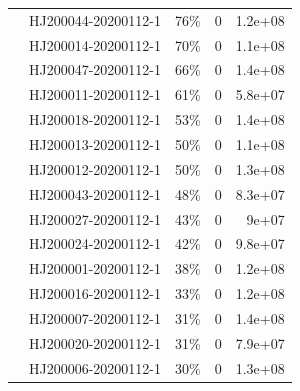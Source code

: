 \documentclass[9pt,twocolumn,twoside]{gsajnl_modified}
\begin{document}
\begin{table}
{\begin{tabular}{llrrr}
                  & HJ200044-20200112-1 &                                       76\% &                        0 &                   1.2e+08 \\
                  & HJ200014-20200112-1 &                                       70\% &                        0 &                   1.1e+08 \\
                  & HJ200047-20200112-1 &                                       66\% &                        0 &                   1.4e+08 \\
                  & HJ200011-20200112-1 &                                       61\% &                        0 &                   5.8e+07 \\
                  & HJ200018-20200112-1 &                                       53\% &                        0 &                   1.4e+08 \\
                  & HJ200013-20200112-1 &                                       50\% &                        0 &                   1.1e+08 \\
                  & HJ200012-20200112-1 &                                       50\% &                        0 &                   1.3e+08 \\
                  & HJ200043-20200112-1 &                                       48\% &                        0 &                   8.3e+07 \\
                  & HJ200027-20200112-1 &                                       43\% &                        0 &                     9e+07 \\
                  & HJ200024-20200112-1 &                                       42\% &                        0 &                   9.8e+07 \\
                  & HJ200001-20200112-1 &                                       38\% &                        0 &                   1.2e+08 \\
                  & HJ200016-20200112-1 &                                       33\% &                        0 &                   1.2e+08 \\
                  & HJ200007-20200112-1 &                                       31\% &                        0 &                   1.4e+08 \\
                  & HJ200020-20200112-1 &                                       31\% &                        0 &                   7.9e+07 \\
                  & HJ200006-20200112-1 &                                       30\% &                        0 &                   1.3e+08 \\

\end{tabular}}
\end{table}
\end{document}
